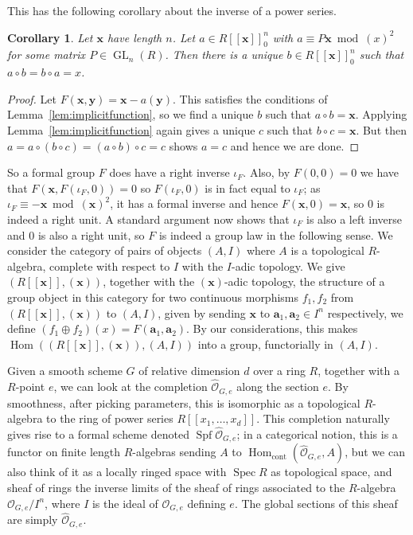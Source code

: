 \documentclass[12pt]{article}
\newcommand{\va}{\mathbf{a}}
\newcommand{\vx}{\mathbf{x}}
\newcommand{\vy}{\mathbf{y}}
\renewcommand{\O}{\mathcal{O}}
\DeclareMathOperator{\Hom}{Hom}
\DeclareMathOperator{\Spec}{Spec}
\DeclareMathOperator{\Spf}{Spf}
\DeclareMathOperator{\GL}{GL}
\theoremstyle{plain}
\newtheorem{cor}[thm]{Corollary} %
\theoremstyle{definition}
\theoremstyle{remark}
\begin{document}
This has the following corollary about the inverse of a power series.
\begin{cor}
\label{lem:formalinverse}
Let $\vx$ have length $n$. Let $a \in R[[\vx]]_0^n$ with $a \equiv P\vx \bmod (x)^2$ for some matrix $P\in \GL_n(R)$. Then there is a unique $b \in R[[\vx]]_0^n$ such that $a \circ b = b \circ a = x$.
\end{cor}
\begin{proof}
Let $F(\vx,\vy) = \vx - a(\vy)$. This satisfies the conditions of Lemma~\ref{lem:implicitfunction}, so we find a unique $b$ such that $a \circ b = \vx$. Applying Lemma~\ref{lem:implicitfunction} again gives a unique $c$ such that $b \circ c = \vx$. But then $a = a \circ (b \circ c) = (a \circ b) \circ c = c$ shows $a = c$ and hence we are done.
\end{proof}
So a formal group $F$ does have a right inverse $\iota_F$. Also, by $F(0,0) = 0$ we have that $F(\vx,F(\iota_F,0)) = 0$ so $F(\iota_F,0)$ is in fact equal to $\iota_F$; as $\iota_F \equiv -\vx \bmod (\vx)^2$, it has a formal inverse and hence $F(\vx,0) = \vx$, so $0$ is indeed a right unit. A standard argument now shows that $\iota_F$ is also a left inverse and $0$ is also a right unit, so $F$ is indeed a group law in the following sense. We consider the category of pairs of objects $(A,I)$ where $A$ is a topological $R$-algebra, complete with respect to $I$ with the $I$-adic topology. We give $(R[[\vx]],(\vx))$, together with the $(\vx)$-adic topology, the structure of a group object in this category for two continuous morphisms $f_1,f_2$ from $(R[[\vx]],(\vx))$ to $(A,I)$, given by sending $\vx$ to $\va_1,\va_2 \in I^n$ respectively, we define $(f_1 \oplus f_2)(x) = F(\va_1,\va_2)$. By our considerations, this makes $\Hom((R[[\vx]],(\vx)),(A,I))$ into a group, functorially in $(A,I)$.

Given a smooth scheme $G$ of relative dimension $d$ over a ring $R$, together with a $R$-point $e$, we can look at the completion $\widehat{\O}_{G,e}$ along the section $e$. By smoothness, after picking parameters, this is isomorphic as a topological $R$-algebra to the ring of power series $R[[x_1,\dots,x_d]]$. This completion naturally gives rise to a formal scheme denoted $\Spf \widehat{\O}_{G,e}$; in a categorical notion, this is a functor on finite length $R$-algebras sending $A$ to $\Hom_{\text{cont}}(\widehat{\O}_{G,e},A)$, but we can also think of it as a locally ringed space with $\Spec R$ as topological space, and sheaf of rings the inverse limits of the sheaf of rings associated to the $R$-algebra $\O_{G,e}/I^n$, where $I$ is the ideal of $\O_{G,e}$ defining $e$. The global sections of this sheaf are simply $\widehat{\O}_{G,e}$. 
\end{document}
